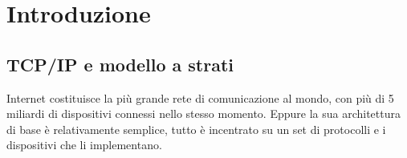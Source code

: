 
\chapter{Introduzione}


\section{TCP/IP e modello a strati}

Internet costituisce la più grande rete di comunicazione al mondo, con più di 5 miliardi \cite{owidinternet} di dispositivi connessi nello stesso momento. Eppure la sua architettura di base è relativamente semplice, tutto è incentrato su un set di protocolli e i dispositivi che li implementano.

